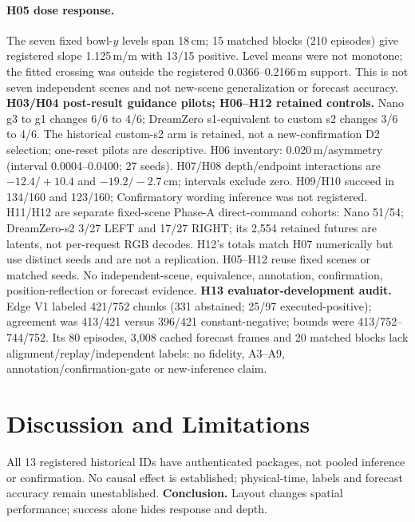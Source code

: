 \documentclass{article}
\begin{document}
\paragraph{H05 dose response.}
The seven fixed bowl-$y$ levels span 18\,cm; 15 matched blocks (210 episodes) give registered slope 1.125\,m/m with 13/15 positive. Level means were not monotone; the fitted crossing was outside the registered 0.0366--0.2166\,m support. This is not seven independent scenes and not new-scene generalization or forecast accuracy.
\textbf{H03/H04 post-result guidance pilots; H06--H12 retained controls.} Nano g3 to g1 changes 6/6 to 4/6; DreamZero s1-equivalent to custom s2 changes 3/6 to 4/6. The historical custom-s2 arm is retained, not a new-confirmation D2 selection; one-reset pilots are descriptive. H06 inventory: 0.020\,m/asymmetry (interval 0.0004--0.0400; 27 seeds). H07/H08 depth/endpoint interactions are $-12.4/+10.4$ and $-19.2/-2.7$\,cm; intervals exclude zero. H09/H10 succeed in 134/160 and 123/160; Confirmatory wording inference was not registered. H11/H12 are separate fixed-scene Phase-A direct-command cohorts: Nano 51/54; DreamZero-s2 3/27 LEFT and 17/27 RIGHT; its 2,554 retained futures are latents, not per-request RGB decodes. H12's totals match H07 numerically but use distinct seeds and are not a replication. H05--H12 reuse fixed scenes or matched seeds. No independent-scene, equivalence, annotation, confirmation, position-reflection or forecast evidence. \textbf{H13 evaluator-development audit.} Edge V1 labeled 421/752 chunks (331 abstained; 25/97 executed-positive); agreement was 413/421 versus 396/421 constant-negative; bounds were 413/752--744/752. Its 80 episodes, 3,008 cached forecast frames and 20 matched blocks lack alignment/replay/independent labels: no fidelity, A3--A9, annotation/confirmation-gate or new-inference claim.

\section{Discussion and Limitations}
All 13 registered historical IDs have authenticated packages, not pooled inference or confirmation. No causal effect is established; physical-time, labels and forecast accuracy remain unestablished. \textbf{Conclusion.} Layout changes spatial performance; success alone hides response and depth.


\end{document}
